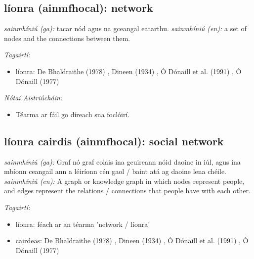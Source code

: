 \documentclass{article}
\begin{document}
\subsection*{líonra (ainmfhocal): network} 
 \noindent \textit{sainmhíniú (ga):} tacar nód agus na gceangal eatarthu.
\newline\newline
 \noindent \textit{sainmhíniú (en):} a set of nodes and the connections between them.
\newline

 \noindent \textit{Tagairtí:}
\begin{itemize}
	\item líonra: De Bhaldraithe (1978) \cite{de-bhaldraithe}, Dineen (1934) \cite{dineen}, Ó Dónaill et al. (1991) \cite{focloir-beag}, Ó Dónaill (1977) \cite{odonaill}
\end{itemize}

 \noindent \textit{Nótaí Aistriúcháin:}
\begin{itemize}
	\item Téarma ar fáil go díreach sna foclóirí.
\end{itemize}


\subsection*{líonra cairdis (ainmfhocal): social network} 
 \noindent \textit{sainmhíniú (ga):} Graf nó graf eolais ina gcuireann nóid daoine in iúl, agus ina mbíonn ceangail ann a léiríonn cén gaol / baint atá ag daoine lena chéile.
\newline\newline
 \noindent \textit{sainmhíniú (en):} A graph or knowledge graph in which nodes represent people, and edges represent the relations / connections that people have with each other.
\newline

 \noindent \textit{Tagairtí:}
\begin{itemize}
	\item líonra: féach ar an téarma 'network / líonra'
	\item cairdeas: De Bhaldraithe (1978) \cite{de-bhaldraithe}, Dineen (1934) \cite{dineen}, Ó Dónaill et al. (1991) \cite{focloir-beag}, Ó Dónaill (1977) \cite{odonaill}
\end{itemize}
\end{document}
